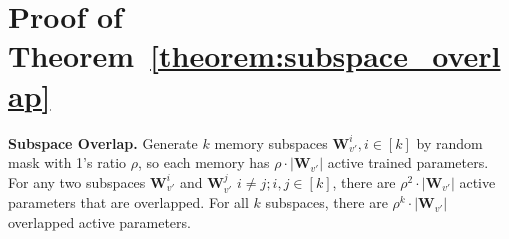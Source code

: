 \section{Proof of Theorem~\ref{theorem:subspace_overlap}}\label{app_sec:proof}

\newcommand{\qedsymbol}{\hfill $\square$}






\begin{theorem}\label{app_theorem:subspace_overlap}
    \textbf{Subspace Overlap.} 
    Generate $k$ memory subspaces $\mathbf{W}_{v'}^{i}, i \in [k]$ by random mask with 1's ratio $\rho$, so each memory has $\rho\cdot|\mathbf{W}_{v'}|$ active trained parameters. For any two subspaces $\mathbf{W}_{v'}^{i}$ and $\mathbf{W}_{v'}^{j}$ $i\neq j ;i,j \in [k]$, there are $\rho^2\cdot|\mathbf{W}_{v'}|$ active parameters that are overlapped. For all $k$ subspaces, there are $\rho^k\cdot|\mathbf{W}_{v'}|$ overlapped active parameters.
\end{theorem}

